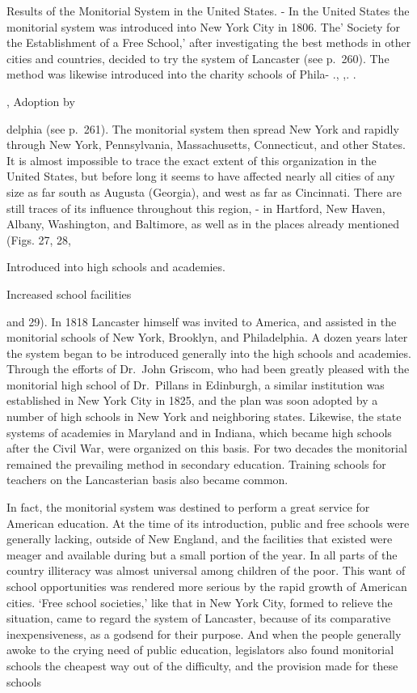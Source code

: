 \documentclass[
]{book}
\begin{document}
Results of the Monitorial System in the United States. - In the United States the monitorial system was introduced into New York City in 1806. The' Society for the Establishment of a Free School,' after investigating the best methods in other cities and countries, decided to try the system of Lancaster (see p.~260). The method was likewise introduced into the charity schools of Phila- ., ,. .

, Adoption by

delphia (see p.~261). The monitorial system then spread New York and rapidly through New York, Pennsylvania, Massachusetts, Connecticut, and other States. It is almost impossible to trace the exact extent of this organization in the United States, but before long it seems to have affected nearly all cities of any size as far south as Augusta (Georgia), and west as far as Cincinnati. There are still traces of its influence throughout this region, - in Hartford, New Haven, Albany, Washington, and Baltimore, as well as in the places already mentioned (Figs. 27, 28,

Introduced into high schools and academies.

Increased school facilities

and 29). In 1818 Lancaster himself was invited to America, and assisted in the monitorial schools of New York, Brooklyn, and Philadelphia. A dozen years later the system began to be introduced generally into the high schools and academies. Through the efforts of Dr.~John Griscom, who had been greatly pleased with the monitorial high school of Dr.~Pillans in Edinburgh, a similar institution was established in New York City in 1825, and the plan was soon adopted by a number of high schools in New York and neighboring states. Likewise, the state systems of academies in Maryland and in Indiana, which became high schools after the Civil War, were organized on this basis. For two decades the monitorial remained the prevailing method in secondary education. Training schools for teachers on the Lancasterian basis also became common.

In fact, the monitorial system was destined to perform a great service for American education. At the time of its introduction, public and free schools were generally lacking, outside of New England, and the facilities that existed were meager and available during but a small portion of the year. In all parts of the country illiteracy was almost universal among children of the poor. This want of school opportunities was rendered more serious by the rapid growth of American cities. `Free school societies,' like that in New York City, formed to relieve the situation, came to regard the system of Lancaster, because of its comparative inexpensiveness, as a godsend for their purpose. And when the people generally awoke to the crying need of public education, legislators also found monitorial schools the cheapest way out of the difficulty, and the provision made for these schools
\end{document}
